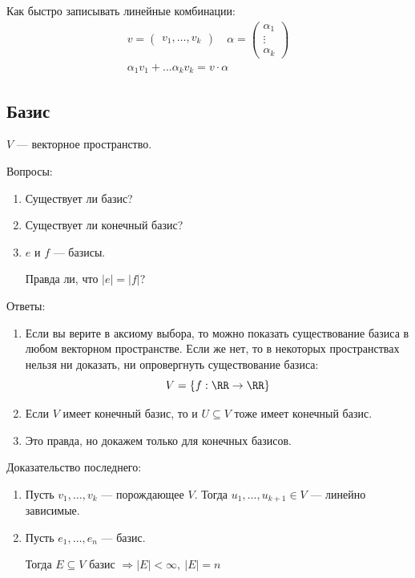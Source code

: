 \begin{remark}{}{}
    Как быстро записывать линейные комбинации:
    \begin{gather*}
        v = \begin{pmatrix}
            v_1, \ldots, v_k
        \end{pmatrix}
        \quad
        \alpha = \begin{pmatrix}
            \alpha_1
            \\
            \vdots
            \\
            \alpha_k
        \end{pmatrix}
        \\
        \alpha_1 v_1 + \ldots \alpha_k v_k = v \cdot \alpha
    \end{gather*}
\end{remark}

\subsection{Базис}

\( V \) --- векторное пространство.

Вопросы:
\begin{enumerate}
    \item
        Существует ли базис?
    \item
        Существует ли конечный базис?
    \item
        \( e \) и \( f \) --- базисы.

        Правда ли, что \( |e| = |f| \)?
\end{enumerate}

Ответы:
\begin{enumerate}
    \item
        Если вы верите в аксиому выбора, то можно показать существование базиса в любом векторном пространстве.
        Если же нет, то в некоторых пространствах нельзя ни доказать, ни опровергнуть существование базиса:
        \[
            V = \{ f : \RR \to \RR \}
        \]
    \item
        Если \( V \) имеет конечный базис, то и \( U \subseteq V \) тоже имеет конечный базис.
    \item
        Это правда, но докажем только для конечных базисов.
\end{enumerate}

Доказательство последнего:
\begin{enumerate}
    \item
        Пусть \( v_1, \ldots, v_k \) --- порождающее \( V \).
        Тогда \( u_1, \ldots, u_{k + 1} \in V \) --- линейно зависимые.
    \item
        Пусть \( e_1, \ldots, e_n \) --- базис.

        Тогда \( E \subseteq V \) базис \( \Rightarrow |E| < \infty, \ |E| = n \)
\end{enumerate}

